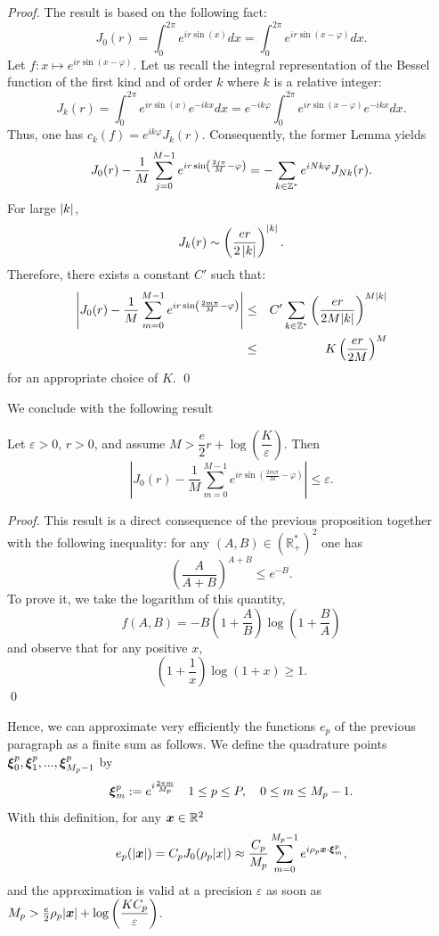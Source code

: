 \documentclass[smallextended]{svjour3}
\begin{document}
\begin{proof}
	The result is based on the following fact: 
	\[J_0(r) =  \int_0^{2\pi} e^{ir\sin(x)}dx = \int_0^{2\pi} e^{ir\sin(x - \varphi)}dx.\] 
	Let $f : x \mapsto e^{ir\sin(x - \varphi)}$. Let us recall the integral representation of the Bessel function of the first kind and of order $k$ where $k$ is a relative integer: \[J_k(r) =  \int_{0}^{2\pi}e^{ir\sin(x)}e^{-ikx}dx =  e^{-ik\varphi}\int_{0}^{2\pi}e^{ir\sin(x - \varphi)}e^{-ikx}dx.\] Thus, one has $c_k(f) = e^{ik\varphi}J_k(r)$. Consequently, the former Lemma yields 
	\[J_0(r) -  \dfrac{1}{M} \sum_{j=0}^{M-1} e^{ir \sin \left( \frac{2j\pi}{M}-\varphi \right)} = -\sum_{k\in \mathbb{Z}^*}e^{iNk\varphi}J_{Nk}(r).\] 
	For large $\left\lvert k \right\rvert$, 
	\[J_k(r) \sim \left(\dfrac{er}{2\left\lvert k \right\rvert}\right)^{\left\lvert k \right\rvert}.\]
	Therefore, there exists a constant $C'$ such that: 
	\begin{eqnarray*}
		\left\lvert J_0(r) -  \dfrac{1}{M}\sum_{m=0}^{M-1}e^{ir\sin\left(\frac{2m\pi}{M}-\varphi\right)} \right\rvert &\leq& C' \sum_{k\in \mathbb{Z}^*} \left(\dfrac{er}{2M|k|}\right)^{M|k|}\\
		&\leq& K \left(\dfrac{er}{2M}\right)^M 
	\end{eqnarray*}
	for an appropriate choice of $K$.	
	\qed
\end{proof}
We conclude with the following result
\begin{proposition} Let $\varepsilon >0$, $r>0$, and assume $M > \dfrac{e}{2}r + \log\left(\dfrac{K}{\varepsilon}\right)$. Then 
	\[\left|J_0(r) -  \dfrac{1}{M}\sum_{m=0}^{M-1}e^{ir\sin\left(\frac{2m\pi}{M}-\varphi\right)} \right| \leq \varepsilon.\]
	\label{suboptCirc}
\end{proposition}
\begin{proof}
	This result is a direct consequence of the previous proposition together with the following inequality: for any $(A,B) \in \left(\mathbb{R}_+^*\right)^2$ one has
	\[ \left( \dfrac{A}{A+B}\right)^{A+B} \leq e^{-B}.\]
	To prove it, we take the logarithm of this quantity, 
	\[f(A,B) = -B\left(1+\dfrac{A}{B}\right)\log\left(1+\dfrac{B}{A}\right)\]
	and observe that for any positive $x$, \[\left(1+\dfrac{1}{x}\right)\log(1+x) \geq 1.\]
	\qed
\end{proof}
																																																		
Hence, we can approximate very efficiently the functions $e_p$ of the previous paragraph as a finite sum as follows. We define the quadrature points $\boldsymbol{\xi}_0^p, \boldsymbol{\xi}_1^p, ..., \boldsymbol{\xi}^p_{M_p-1}$  by
\begin{equation}
	\label{defXimp}
	\boldsymbol{\xi}_m^p := \displaystyle e^{i\frac{2\pi m}{M_p}} \quad 1\leq p \leq P, \quad 0 \leq m \leq M_p -1.
\end{equation}
With this definition, for any $\boldsymbol{x} \in \mathbb{R}^2$
\[ e_p(|\boldsymbol{x}|) = C_p J_0(\rho_p |x|)\approx \dfrac{C_p}{M_p}\sum_{m=0}^{M_p-1}{e^{i \rho_p \boldsymbol{x} \cdot \boldsymbol{\xi}_m^p}},\]
and the approximation is valid at a precision $\varepsilon$ as soon as $M_p > \frac{e}{2}\rho_p|\boldsymbol{x}| + \log\left(\dfrac{KC_p}{\varepsilon}\right)$.
																																																		
\end{document}
